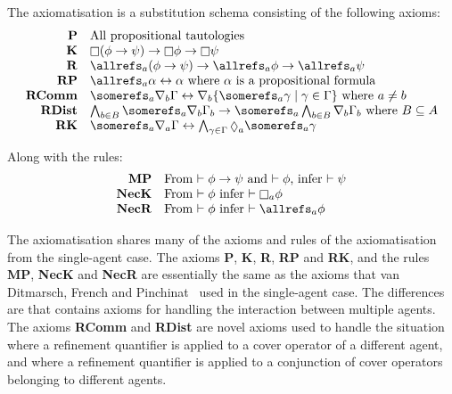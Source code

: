 \begin{definition}
The axiomatisation \axiomKF{} is a substitution schema consisting of the
following axioms:
$$
\begin{array}{rl}
{\bf P} & \text{All propositional tautologies}\\
{\bf K} & \knows (\phi \implies \psi) \implies \knows \phi \implies \knows
\psi\\
{\bf R} & \allrefs_a (\phi \implies \psi) \implies \allrefs_a \phi \implies
\allrefs_a \psi\\
{\bf RP} & \allrefs_a \alpha \iff \alpha \text{ where $\alpha$ is a
propositional formula}\\
{\bf RComm} & \somerefs_a \covers_b \Gamma \iff \covers_b \{\somerefs_a \gamma
\mid \gamma \in \Gamma\} \text{ where $a \neq b$}\\
{\bf RDist} & \bigwedge_{b \in B} \somerefs_a \covers_b \Gamma_b \implies
\somerefs_a \bigwedge_{b \in B} \covers_b \Gamma_b \text{ where $B \subseteq A$}\\
{\bf RK} & \somerefs_a \covers_a \Gamma \iff \bigwedge_{\gamma \in \Gamma}
\suspects_a \somerefs_a \gamma\\
\end{array}
$$

Along with the rules:
$$
\begin{array}{rl}
{\bf MP} & \text{From $\proves \phi \implies \psi$ and $\proves \phi$, infer
$\proves \psi$}\\
{\bf NecK} & \text{From $\proves \phi$ infer $\proves \knows_a \phi$}\\
{\bf NecR} & \text{From $\proves \phi$ infer $\proves \allrefs_a \phi$}
\end{array}
$$
\end{definition}

The axiomatisation \axiomKF{} shares many of the axioms and rules of the
axiomatisation from the single-agent case. The axioms {\bf P}, {\bf K}, {\bf R},
{\bf RP} and {\bf RK}, and the rules {\bf MP}, {\bf NecK} and {\bf NecR} are
essentially the same as the axioms that van Ditmarsch, French and
Pinchinat~\cite{french2010future} used in the single-agent case. The differences
are that \axiomKF{} contains axioms for handling the interaction between
multiple agents. The axioms {\bf RComm} and {\bf RDist} are novel axioms used to
handle the situation where a refinement quantifier is applied to a cover
operator of a different agent, and where a refinement quantifier is applied to a
conjunction of cover operators belonging to different agents.

